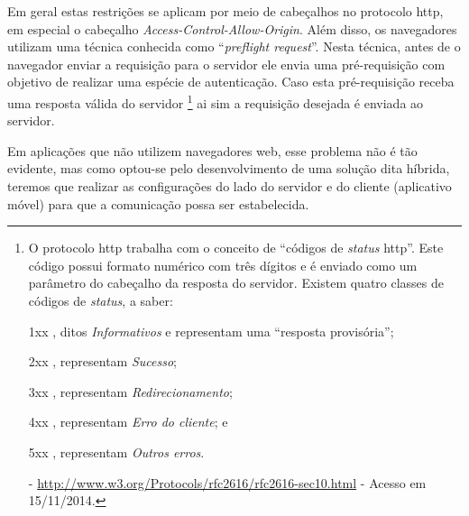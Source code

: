 Em geral estas restrições se aplicam por meio de cabeçalhos no protocolo \gls{http}, em especial o cabeçalho \textit{Access-Control-Allow-Origin}. Além disso, os navegadores utilizam uma técnica conhecida como ``\textit{preflight request}''. Nesta técnica, antes de o navegador enviar a requisição para o servidor ele envia uma pré-requisição com objetivo de realizar uma espécie de autenticação. Caso esta pré-requisição receba uma resposta válida do servidor%
\footnote{O protocolo \gls{http} trabalha com o conceito de ``códigos de \textit{status} \gls{http}''. Este código possui formato numérico com três dígitos e é enviado como um parâmetro do cabeçalho da resposta do servidor. Existem quatro classes de códigos de \textit{status}, a saber:
\begin{enumerate*}[label=\itshape\alph*\upshape)]
    \item[1xx], ditos \textit{Informativos} e representam uma ``resposta provisória'';
    \item[2xx], representam \textit{Sucesso};
    \item[3xx], representam \textit{Redirecionamento};
    \item[4xx], representam \textit{Erro do cliente}; e
    \item[5xx], representam \textit{Outros erros}.
\end{enumerate*} - \url{http://www.w3.org/Protocols/rfc2616/rfc2616-sec10.html} - Acesso em 15/11/2014.
}
ai sim a requisição desejada é enviada ao servidor.

Em aplicações que não utilizem navegadores web, esse problema não é tão evidente, mas como optou-se pelo desenvolvimento de uma solução dita híbrida, teremos que realizar as configurações do lado do servidor e do cliente (aplicativo móvel) para que a comunicação possa ser estabelecida.